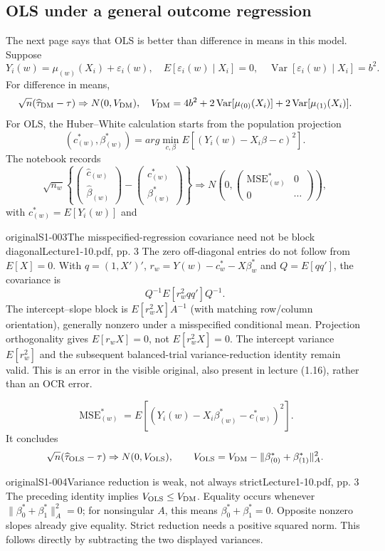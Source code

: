 \subsection{OLS under a general outcome regression}
The next page says that OLS is better than difference in means in this model. Suppose
\[
Y_i(w)=\mu_{(w)}(X_i)+\varepsilon_i(w),\quad
E[\varepsilon_i(w)\mid X_i]=0,\quad
\operatorname{Var}[\varepsilon_i(w)\mid X_i]=b^2.
\]
For difference in means,
\[
\sqrt n(\widehat\tau_{\rm DM}-\tau)\Rightarrow N(0,V_{\rm DM}),\quad
V_{\rm DM}=4b^2+2\operatorname{Var}[\mu_{(0)}(X_i)]
+2\operatorname{Var}[\mu_{(1)}(X_i)].
\]
For OLS, the Huber--White calculation starts from the population projection
\[
(c^*_{(w)},\beta^*_{(w)})=arg\min_{c,\beta}
 E[(Y_i(w)-X_i\beta-c)^2].
\]
The notebook records
\[
\sqrt{n_w}\left\{\begin{pmatrix}\widehat c_{(w)}\\\widehat\beta_{(w)}\end{pmatrix}
-\begin{pmatrix}c^*_{(w)}\\\beta^*_{(w)}\end{pmatrix}\right\}
\Rightarrow N\left(0,\begin{pmatrix}\operatorname{MSE}^*_{(w)}&0\\0&\cdots\end{pmatrix}\right),
\]
with $c^*_{(w)}=E[Y_i(w)]$ and
\begin{reviewnote}{original}{S1-003}{The misspecified-regression covariance need not be block diagonal}{Lecture1-10.pdf, pp. 3}
The zero off-diagonal entries do not follow from $E[X]=0$. With $q=(1,X')'$, $r_w=Y(w)-c_w^*-X\beta_w^*$ and $Q=E[qq']$, the covariance is
\[
Q^{-1}E[r_w^2qq']Q^{-1}.
\]
The intercept--slope block is $E[r_w^2X]A^{-1}$ (with matching row/column orientation), generally nonzero under a misspecified conditional mean. Projection orthogonality gives $E[r_wX]=0$, not $E[r_w^2X]=0$. The intercept variance $E[r_w^2]$ and the subsequent balanced-trial variance-reduction identity remain valid. This is an error in the visible original, also present in lecture (1.16), rather than an OCR error.
\end{reviewnote}

\[
\operatorname{MSE}^*_{(w)}=E[(Y_i(w)-X_i\beta^*_{(w)}-c^*_{(w)})^2].
\]
It concludes
\[
\sqrt n(\widehat\tau_{\rm OLS}-\tau)\Rightarrow N(0,V_{\rm OLS}),\qquad
V_{\rm OLS}=V_{\rm DM}-\|\beta^*_{(0)}+\beta^*_{(1)}\|_A^2.
\]
\begin{reviewnote}{original}{S1-004}{Variance reduction is weak, not always strict}{Lecture1-10.pdf, pp. 3}
The preceding identity implies $V_{\rm OLS}\le V_{\rm DM}$. Equality occurs whenever $\|\beta_0^*+\beta_1^*\|_A^2=0$; for nonsingular $A$, this means $\beta_0^*+\beta_1^*=0$. Opposite nonzero slopes already give equality. Strict reduction needs a positive squared norm. This follows directly by subtracting the two displayed variances.
\end{reviewnote}


